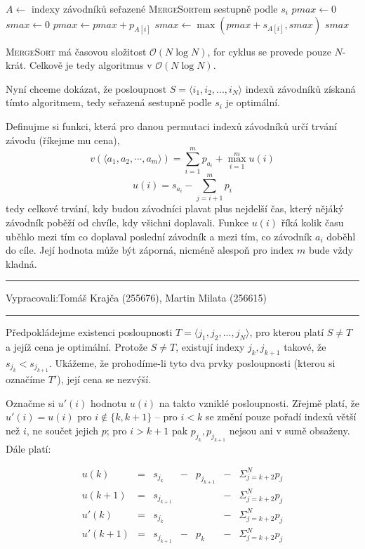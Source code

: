 \documentclass[12pt]{article}
\newcommand{\la}{\leftarrow}
\renewcommand{\O}{\mathcal{O}}
\newcommand{\zadani}[2]{
{\large
\noindent {\bf IB108 \hfill{} Sada #1, Příklad #2 \\[-4mm]}
\noindent\hrule
\vspace{2mm}
\noindent Vypracovali:\hfill{}Tomáš Krajča (255676), Martin Milata (256615)
\vspace{3mm}
\hrule
\bigskip\bigskip}
}
\begin{document}
\begin{algorithm}
\begin{algorithmic}
\STATE $A \la$ indexy závodníků seřazené \textsc{MergeSort}em sestupně podle $s_i$
\STATE $pmax \la 0$
\STATE $smax \la 0$
\FOR{$i \la 1 $ to $N$}
\STATE $pmax \la pmax + p_{A[i]}$
\STATE $smax \la \max(pmax+s_{A[i]},smax)$
\ENDFOR
\RETURN $smax$
\end{algorithmic}
\end{algorithm}

\noindent
\textsc{MergeSort} má časovou složitost $\O(N\log N)$, for cyklus se provede pouze $N$-krát.
Celkově je tedy algoritmus v $\O(N\log N)$.

\bigskip

\noindent
Nyní chceme dokázat, že posloupnost $S = \langle i_1,i_2,...,i_N \rangle$ indexů závodníků získaná tímto
algoritmem, tedy seřazená sestupně podle $s_i$ je optimální.

Definujme si funkci, která pro danou permutaci indexů závodníků určí trvání závodu (říkejme mu cena),
$$ v(\langle a_1,a_2,\cdots,a_m \rangle) = \sum_{i=1}^m p_{a_i} + \max_{i=1}^m u(i)$$
$$ u(i) = s_{a_i} - \sum_{j=i+1}^m p_i$$
tedy celkové trvání, kdy budou závodníci plavat plus nejdelší čas, který nějáký závodník poběží od
chvíle, kdy všichni doplavali. Funkce $u(i)$ říká kolik času uběhlo mezi tím co doplaval poslední
závodník a mezi tím, co závodník $a_i$ doběhl do cíle. Její hodnota může být záporná, nicméně
alespoň pro index $m$ bude vždy kladná.

\clearpage
\zadani{2}{2}

\noindent
Předpokládejme existenci posloupnosti $T = \langle j_1,j_2,...,j_N \rangle$, pro kterou platí $S
\neq T$ a jejíž cena je optimální. Protože $S \neq T$, existují indexy $j_k, j_{k+1}$ takové, že
$s_{j_k} < s_{j_{k+1}}$. Ukážeme, že prohodíme-li tyto dva prvky posloupnosti (kterou si označíme
$T'$), její cena se nezvýší.

Označme si $u'(i)$ hodnotu $u(i)$ na takto vzniklé posloupnosti. Zřejmě platí, že $u'(i) = u(i)$ pro
$i \notin \{k, k+1\}$ -- pro $i < k$ se změní pouze pořadí indexů větší než $i$, ne součet jejich
$p$; pro $i > k+1$ pak $p_{j_k}, p_{j_{k+1}}$ nejsou ani v sumě obsaženy. Dále platí:

$$
\begin{array}{rclclcl}
u(k)    & = & s_{j_k}     & - & p_{j_{k+1}} & - & \Sigma_{j=k+2}^N p_j \\
u(k+1)  & = & s_{j_{k+1}} &     &               & - & \Sigma_{j=k+2}^N p_j \\
u'(k)   & = & s_{j_k}     &     &               & - & \Sigma_{j=k+2}^N p_j \\
u'(k+1) & = & s_{j_{k+1}} & - & p_k         & - & \Sigma_{j=k+2}^N p_j \\
\end{array}
$$
\end{document}
